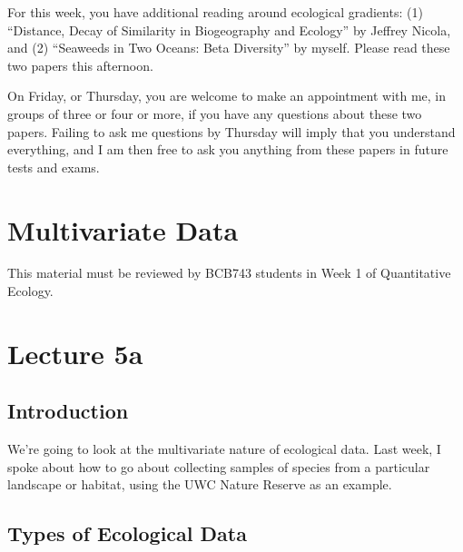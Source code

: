 \documentclass[
  12pt,
]{book}
\begin{document}
For this week, you have additional reading around ecological gradients:
(1) ``Distance, Decay of Similarity in Biogeography and Ecology'' by
Jeffrey Nicola, and (2) ``Seaweeds in Two Oceans: Beta Diversity'' by
myself. Please read these two papers this afternoon.

On Friday, or Thursday, you are welcome to make an appointment with me,
in groups of three or four or more, if you have any questions about
these two papers. Failing to ask me questions by Thursday will imply
that you understand everything, and I am then free to ask you anything
from these papers in future tests and exams.

\chapter{Multivariate Data}\label{sec-lect5}

\begin{tcolorbox}[enhanced jigsaw, arc=.35mm, bottomtitle=1mm, breakable, left=2mm, colback=white, bottomrule=.15mm, opacityback=0, rightrule=.15mm, opacitybacktitle=0.6, titlerule=0mm, colframe=quarto-callout-note-color-frame, toptitle=1mm, title=\textcolor{quarto-callout-note-color}{\faInfo}\hspace{0.5em}{BCB743}, coltitle=black, toprule=.15mm, leftrule=.75mm, colbacktitle=quarto-callout-note-color!10!white]

This material must be reviewed by BCB743 students in Week 1 of
Quantitative Ecology.

\end{tcolorbox}

\chapter*{Lecture 5a}\label{lecture-5a}

\section{Introduction}\label{introduction}

We're going to look at the multivariate nature of ecological data. Last
week, I spoke about how to go about collecting samples of species from a
particular landscape or habitat, using the UWC Nature Reserve as an
example.

\section{Types of Ecological Data}\label{types-of-ecological-data}
\end{document}
